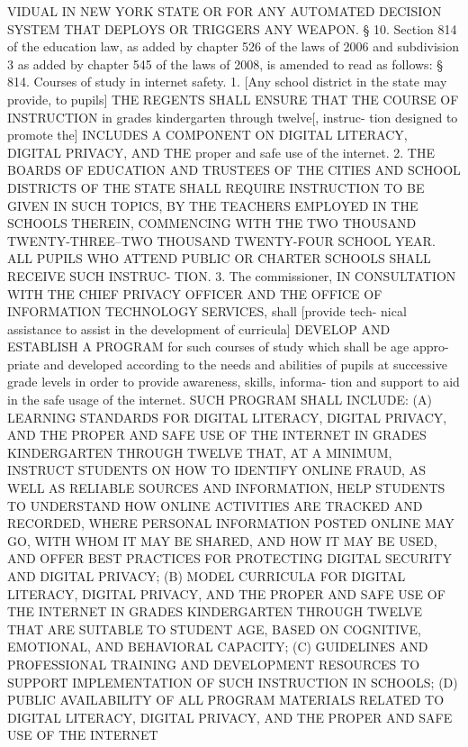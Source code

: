  VIDUAL IN NEW YORK STATE OR  FOR  ANY  AUTOMATED  DECISION  SYSTEM  THAT
 DEPLOYS OR TRIGGERS ANY WEAPON.
   § 10. Section 814 of the education law, as added by chapter 526 of the
 laws  of  2006  and subdivision 3 as added by chapter 545 of the laws of
 2008, is amended to read as follows:
   § 814. Courses of study in internet safety. 1. [Any school district in
 the state may provide, to pupils] THE  REGENTS  SHALL  ENSURE  THAT  THE
 COURSE  OF  INSTRUCTION in grades kindergarten through twelve[, instruc-
 tion designed to promote the] INCLUDES A COMPONENT ON DIGITAL  LITERACY,
 DIGITAL PRIVACY, AND THE proper and safe use of the internet.
   2.    THE  BOARDS  OF  EDUCATION AND TRUSTEES OF THE CITIES AND SCHOOL
 DISTRICTS OF THE STATE SHALL REQUIRE INSTRUCTION TO  BE  GIVEN  IN  SUCH
 TOPICS, BY THE TEACHERS EMPLOYED IN THE SCHOOLS THEREIN, COMMENCING WITH
 THE TWO THOUSAND TWENTY-THREE--TWO THOUSAND TWENTY-FOUR SCHOOL YEAR. ALL
 PUPILS  WHO ATTEND PUBLIC OR CHARTER SCHOOLS SHALL RECEIVE SUCH INSTRUC-
 TION.
   3. The commissioner, IN CONSULTATION WITH THE  CHIEF  PRIVACY  OFFICER
 AND  THE OFFICE OF INFORMATION TECHNOLOGY SERVICES, shall [provide tech-
 nical assistance to assist in the development of curricula] DEVELOP  AND
 ESTABLISH  A PROGRAM for such courses of study which shall be age appro-
 priate and developed according to the needs and abilities of  pupils  at
 successive  grade levels in order to provide awareness, skills, informa-
 tion and support to aid in the safe usage of the internet. SUCH  PROGRAM
 SHALL INCLUDE:
   (A)  LEARNING STANDARDS FOR DIGITAL LITERACY, DIGITAL PRIVACY, AND THE
 PROPER AND SAFE USE OF  THE  INTERNET  IN  GRADES  KINDERGARTEN  THROUGH
 TWELVE  THAT,  AT A MINIMUM, INSTRUCT STUDENTS ON HOW TO IDENTIFY ONLINE
 FRAUD, AS WELL AS RELIABLE SOURCES AND  INFORMATION,  HELP  STUDENTS  TO
 UNDERSTAND  HOW  ONLINE  ACTIVITIES  ARE  TRACKED  AND  RECORDED,  WHERE
 PERSONAL INFORMATION POSTED ONLINE MAY GO, WITH WHOM IT MAY  BE  SHARED,
 AND  HOW IT MAY BE USED, AND OFFER BEST PRACTICES FOR PROTECTING DIGITAL
 SECURITY AND DIGITAL PRIVACY;
   (B) MODEL CURRICULA FOR DIGITAL LITERACY,  DIGITAL  PRIVACY,  AND  THE
 PROPER  AND  SAFE  USE  OF  THE  INTERNET IN GRADES KINDERGARTEN THROUGH
 TWELVE THAT ARE SUITABLE TO STUDENT AGE, BASED ON COGNITIVE,  EMOTIONAL,
 AND BEHAVIORAL CAPACITY;
   (C)  GUIDELINES AND PROFESSIONAL TRAINING AND DEVELOPMENT RESOURCES TO
 SUPPORT IMPLEMENTATION OF SUCH INSTRUCTION IN SCHOOLS;
   (D) PUBLIC AVAILABILITY OF ALL PROGRAM MATERIALS  RELATED  TO  DIGITAL
 LITERACY,  DIGITAL  PRIVACY, AND THE PROPER AND SAFE USE OF THE INTERNET
